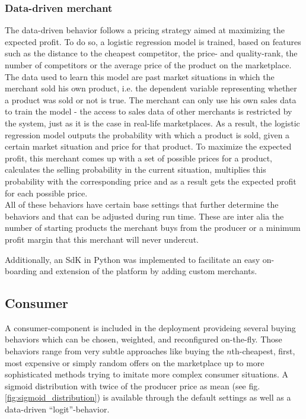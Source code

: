 %
\subsubsection{Data-driven merchant}
%
The data-driven behavior follows a pricing strategy aimed at maximizing the expected profit. To do so, a logistic regression model is trained, based on features such as the distance to the cheapest competitor, the price- and quality-rank, the number of competitors or the average price of the product on the marketplace. The data used to learn this model are past market situations in which the merchant sold his own product, i.e. the dependent variable representing whether a product was sold or not is true. The merchant can only use his own sales data to train the model - the access to sales data of other merchants is restricted by the system, just as it is the case in real-life marketplaces. As a result, the logistic regression model outputs the probability with which a product is sold, given a certain market situation and price for that product. To maximize the expected profit, this merchant comes up with a set of possible prices for a product, calculates the selling probability in the current situation, multiplies this probability with the corresponding price and as a result gets the expected profit for each possible price. \\

All of these behaviors have certain base settings that further determine the behaviors and that can be adjusted during run time. These are inter alia the number of starting products the merchant buys from the producer or a minimum profit margin that this merchant will never undercut.

Additionally, an SdK in Python was implemented to facilitate an easy on-boarding and extension of the platform by adding custom merchants.

\subsection{Consumer}
\label{sec:Behaviors_Consumer}
%

A consumer-component is included in the deployment provideing several buying behaviors which can be chosen, weighted, and reconfigured on-the-fly. Those behaviors range from very subtle approaches like buying the $n$th-cheapest, first, most expensive or simply random offers on the marketplace up to more sophisticated methods trying to imitate more complex consumer situations. A sigmoid distribution with twice of the producer price as mean (see fig. \ref{fig:sigmoid_distribution}) is available through the default settings as well as a data-driven ``logit''-behavior.

